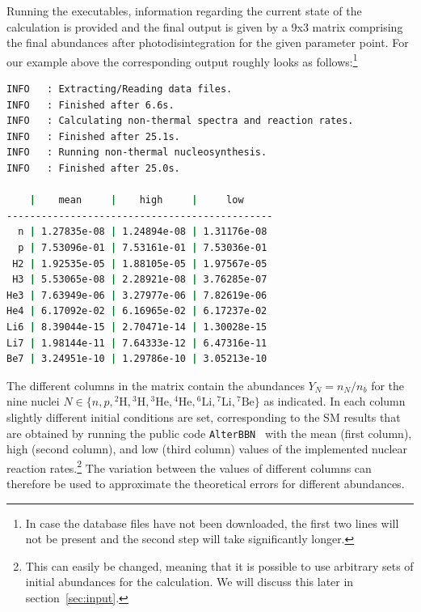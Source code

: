 \documentclass[11pt,a4paper]{article}
\begin{document}
Running the executables, information regarding the current state of the calculation is provided and the final output is given by a 9x3 matrix comprising the final abundances after photodisintegration for the given parameter point. For our example above the corresponding output roughly looks as follows:\footnote{In case the database files have not been downloaded, the first two lines will not be present and the second step will take significantly longer.}
\begin{lstlisting}[language=bash, backgroundcolor=\color{white}]
INFO   : Extracting/Reading data files.
INFO   : Finished after 6.6s.
INFO   : Calculating non-thermal spectra and reaction rates.
INFO   : Finished after 25.1s.
INFO   : Running non-thermal nucleosynthesis.
INFO   : Finished after 25.0s.

    |    mean     |    high     |     low
----------------------------------------------
  n | 1.27835e-08 | 1.24894e-08 | 1.31176e-08
  p | 7.53096e-01 | 7.53161e-01 | 7.53036e-01
 H2 | 1.92535e-05 | 1.88105e-05 | 1.97567e-05
 H3 | 5.53065e-08 | 2.28921e-08 | 3.76285e-07
He3 | 7.63949e-06 | 3.27977e-06 | 7.82619e-06
He4 | 6.17092e-02 | 6.16965e-02 | 6.17237e-02
Li6 | 8.39044e-15 | 2.70471e-14 | 1.30028e-15
Li7 | 1.98144e-11 | 7.64333e-12 | 6.47316e-11
Be7 | 3.24951e-10 | 1.29786e-10 | 3.05213e-10
\end{lstlisting}
\vspace{5mm}
The different columns in the matrix contain the abundances $Y_N = n_N/n_b$ for the nine nuclei $N\in\{n, p, {}^2\text{H}, {}^3\text{H}, {}^3\text{He}, {}^4\text{He}, {}^6\text{Li}, {}^7\text{Li}, {}^7\text{Be}\}$ as indicated. In each column slightly different initial conditions are set,
corresponding to the SM results that are obtained by running the public code \texttt{AlterBBN}~\cite{Arbey:2011nf,Arbey:2018zfh} with the mean (first column), high (second column), and low (third column) values of the implemented nuclear reaction rates.\footnote{This can easily be changed, meaning that it is possible to use arbitrary sets of initial abundances for the calculation. We will discuss this later in section~\ref{sec:input}.}
The variation between the values of different columns can therefore be used to approximate the  theoretical errors for different abundances.
\end{document}
